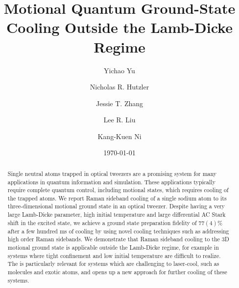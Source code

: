 \documentclass[aps,prl,twocolumn,groupedaddress]{revtex4-1}
\begin{document}
\title{Motional Quantum Ground-State Cooling Outside the Lamb-Dicke Regime}
\author{Yichao Yu}
\author{Nicholas R. Hutzler}
\author{Jessie T. Zhang}
\author{Lee R. Liu}
\author{Kang-Kuen Ni}

\date{\today}

\begin{abstract}
  Single neutral atoms trapped in optical tweezers are a promising system for many applications
  in quantum information and simulation.
  These applications typically require complete quantum control, including motional states, which requires cooling of the trapped atoms.
  We report Raman sideband cooling of a single sodium atom to its three-dimensional
  motional ground state in an optical tweezer.
  Despite having a very large Lamb-Dicke parameter, high initial temperature and
  large differential AC Stark shift in the excited state,
  we achieve a ground state preparation fidelity of $77(4)\%$ after a few hundred ms of cooling
  by using novel cooling techniques such as addressing high order Raman sidebands.
  We demonstrate that Raman sideband cooling to the 3D motional ground state is applicable outside the Lamb-Dicke regime, for example in
  systems where tight confinement and low initial temperature are difficult to realize.
  The is particularly relevant for systems which are challenging to laser-cool,
  such as molecules and exotic atoms, and opens up a new approach for further cooling
  of these systems.
\end{abstract}

\maketitle
\end{document}
